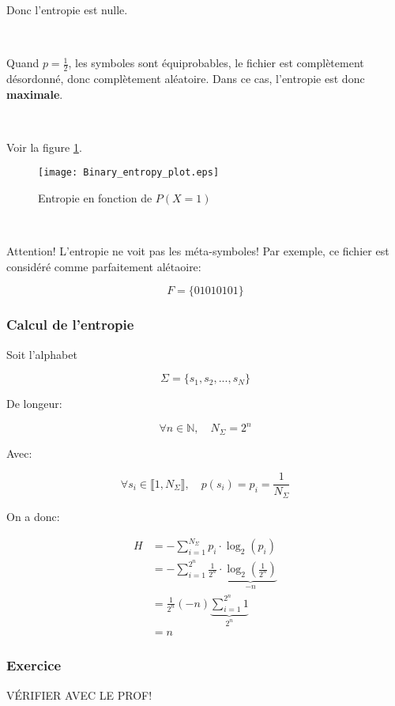 \documentclass[a4paper,11pt]{article}
\newcommand{\N}{\mathbb{N}}
\newcommand{\ti}{\cdot}
\begin{document}
Donc l'entropie est nulle.


\

Quand $p = \frac{1}{2}$, les symboles sont équiprobables, le fichier est
complètement désordonné, donc complètement aléatoire. Dans ce cas, l'entropie
est donc \textbf{maximale}.

\

Voir la figure \ref{entropy_prob}.

\begin{figure}[!h]
  \centering
  \texttt{[image: Binary\_entropy\_plot.eps]}
  \caption{Entropie en fonction de $P(X = 1)$}
  \label{entropy_prob}
\end{figure}

\

Attention! L'entropie ne voit pas les méta-symboles! Par exemple, ce fichier
est considéré comme parfaitement alétaoire:

$$ F = \{01010101\} $$

\subsubsection{Calcul de l'entropie}

Soit l'alphabet

$$ \Sigma = \{s_1, s_2, ..., s_N\} $$

De longeur:

$$ \forall n \in \N, \quad N_{\Sigma}= 2^n $$

Avec:

$$ \forall s_i \in \llbracket 1, N_{\Sigma} \rrbracket, \quad p(s_i) = p_i = \frac{1}{N_{\Sigma}} $$

On a donc:

\begin{align*}
  H &= - \sum_{i = 1}^{N_{\Sigma}}p_i \ti \log_2(p_i) \\
    &= - \sum_{i = 1}^{2^n} \frac{1}{2^n} \ti \underbrace{\log_2\left(\frac{1}{2^n} \right)}_{- n} \\
    &= \frac{1}{2^n} (-n) \underbrace{\sum_{i = 1}^{2^n} 1}_{2^n} \\
    &= n
\end{align*}

\subsubsection{Exercice}

VÉRIFIER AVEC LE PROF!

\
\end{document}
